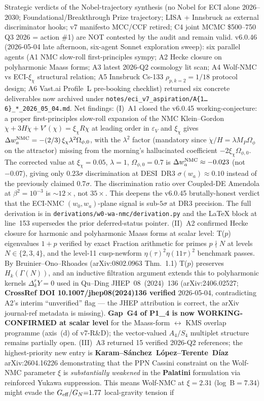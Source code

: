 \documentclass[reprint,amsmath,amssymb,aps,prd,superscriptaddress]{revtex4-2}
\providecommand{\1}{\mathbf{1}}
\begin{document}
Strategic verdicts of the Nobel-trajectory synthesis (no Nobel for ECI alone 2026--2030; Foundational/Breakthrough Prize trajectory; LISA + Innsbruck as external discriminator hooks; v7 manifesto MCC/CCF retired; C4 joint MCMC \$500--750 Q3 2026 = action \#1) are NOT contested by the audit and remain valid. v6.0.46 (2026-05-04 late afternoon, six-agent Sonnet exploration sweep): six parallel agents (A1 NMC slow-roll first-principles sympy; A2 Hecke closure on polyharmonic Maass forms; A3 latest 2026-Q2 cosmology lit scan; A4 Wolf-NMC vs ECI-$\xi_\chi$ structural relation; A5 Innsbruck Cs-133 $\rho_{p,k=2}{=}1/18$ protocol design; A6 Vast.ai Profile~L pre-booking checklist) returned six concrete deliverables now archived under \texttt{notes/eci\_v7\_aspiration/A\{1\ldots6\}\_*\_2026\_05\_04.md}. Net findings:
(I)~A1 closed the v6.0.45 working-conjecture: a proper first-principles slow-roll expansion of the NMC Klein--Gordon $\ddot\chi + 3H\dot\chi + V'(\chi) = \xi_\chi R\chi$ at leading order in $\varepsilon_V$ and $\xi_\chi$ gives $\Delta w_a^{\rm NMC} = -(2/3)\,\xi_\chi\lambda^2\Omega_{\phi,0}$, with the $\lambda^2$ factor (mandatory since $\dot\chi/H = \lambda M_P\Omega_\phi$ on the attractor) missing from the morning's hallucinated coefficient $-2\xi_\chi\Omega_{\phi,0}$. The corrected value at $\xi_\chi{=}0.05$, $\lambda{=}1$, $\Omega_{\phi,0}{=}0.7$ is $\Delta w_a^{\rm NMC} \approx -0.023$ (not $-0.07$), giving only $0.23\sigma$ discrimination at DESI~DR3 $\sigma(w_a){\approx}0.10$ instead of the previously claimed $0.7\sigma$. The discrimination ratio over Coupled-DE Amendola at $\beta^2{=}10^{-3}$ is $\sim 12\times$, not $35\times$. This deepens the v6.0.45 brutally-honest verdict that the ECI-NMC $(w_0,w_a)$-plane signal is sub-$5\sigma$ at DR3 precision. The full derivation is in \texttt{derivations/w0-wa-nmc/derivation.py} and the LaTeX block at line~153 supersedes the prior deferred-status pointer. (II)~A2 confirmed Hecke closure for harmonic and polyharmonic Maass forms at scalar level: T($p$) eigenvalues $1{+}p$ verified by exact Fraction arithmetic for primes $p \nmid N$ at levels $N \in \{2,3,4\}$, and the level-11 cusp-newform $\eta(\tau)^2\eta(11\tau)^2$ benchmark passes. By Bruinier--Ono--Rhoades (arXiv:0802.0963 Thm.~1.1) T($p$) preserves $H_k(\Gamma(N))$, and an inductive filtration argument extends this to polyharmonic kernels $\Delta_k^r Y = 0$ used in Qu--Ding JHEP~08~(2024)~136 (arXiv:2406.02527; \textbf{CrossRef DOI 10.1007/jhep08(2024)136 verified} 2026-05-04, contradicting A2's interim ``unverified'' flag --- the JHEP attribution is correct, the arXiv journal-ref metadata is missing). \textbf{Gap~G4 of P1\_4 is now WORKING-CONFIRMED at scalar level} for the Maass-form $\leftrightarrow$ KMS overlap programme (axis~(d) of v7-R\&D); the vector-valued $A_4/S_4$ multiplet structure remains partially open. (III)~A3 returned 15 verified 2026-Q2 references; the highest-priority new entry is \textbf{Karam--S\'{a}nchez~L\'opez--Terente~D\'iaz} arXiv:2604.16226 demonstrating that the PPN Cassini constraint on the Wolf-NMC parameter $\xi$ is \emph{substantially weakened} in the \textbf{Palatini} formulation via reinforced Yukawa suppression. This means Wolf-NMC at $\xi=2.31$ (log~B$=7.34$) might evade the $G_{\rm eff}/G_N{=}1.77$ local-gravity tension if 
\end{document}
